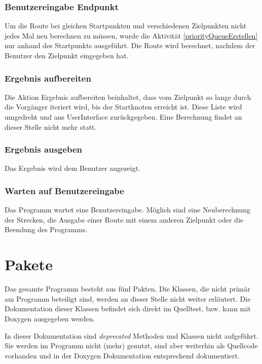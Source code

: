 \documentclass[12pt, a4paper, ngerman]{article}
\newcommand{\todo}[1]{\fcolorbox{red}{yellow}{ \parbox{0.75\linewidth}{#1}}} %
\begin{document}

\subsubsection{Benutzereingabe Endpunkt}
Um die Route bei gleichen Startpunkten und verschiedenen Zielpunkten nicht jedes Mal neu berechnen zu müssen, wurde die Aktivität \ref{priorityQueueErstellen} nur anhand des Startpunkts ausgeführt. Die Route wird berechnet, nachdem der Benutzer den Zielpunkt eingegeben hat.

\subsubsection{Ergebnis aufbereiten}
Die Aktion Ergebnis aufbereiten beinhaltet, dass vom Zielpunkt so lange durch die Vorgänger iteriert wird, bis der Startknoten erreicht ist. Diese Liste wird umgedreht und ans UserInterface zurückgegeben. Eine Berechnung findet an dieser Stelle nicht mehr statt.

\subsubsection{Ergebnis ausgeben}
Das Ergebnis wird dem Benutzer angezeigt.

\subsubsection{Warten auf Benutzereingabe}
Das Programm wartet eine Benutzereingabe. Möglich sind eine Neuberechnung der Strecken, die Ausgabe einer Route mit einem anderen Zielpunkt oder die Beendung des Programms.

\section{Pakete}
Das gesamte Programm besteht aus fünf Pakten. Die Klassen, die nicht primär am Programm beteiligt sind, werden an dieser Stelle nicht weiter erläutert. Die Dokumentation dieser Klassen befindet sich direkt im Quelltest, bzw. kann mit Doxygen ausgegeben werden.

In dieser Dokumentation sind \textit{deprecated} Methoden und Klassen nicht aufgeführt. Sie werden im Programm nicht (mehr) genutzt, sind aber weiterhin als Quellcode vorhanden und in der Doxygen Dokumentation entsprechend  dokumentiert.
\end{document}
